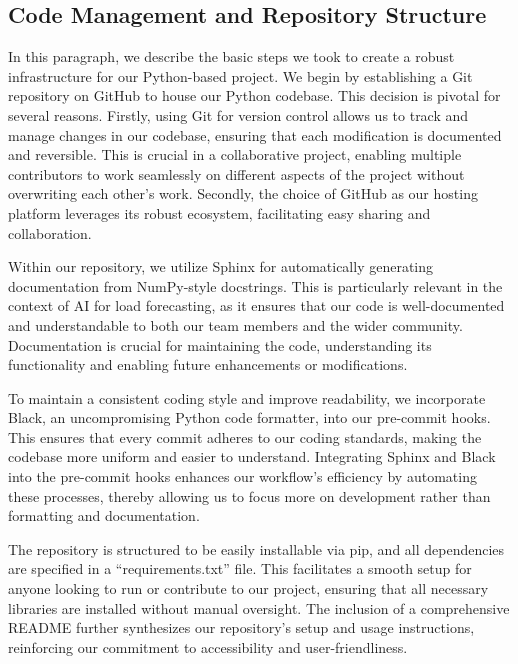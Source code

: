 \documentclass{article} %
\begin{document}
\subsection{Code Management and Repository Structure}
In this paragraph, we describe the basic steps we took to create a robust infrastructure for our Python-based project. We begin by establishing a Git repository on GitHub to house our Python codebase. This decision is pivotal for several reasons. Firstly, using Git for version control allows us to track and manage changes in our codebase, ensuring that each modification is documented and reversible. This is crucial in a collaborative project, enabling multiple contributors to work seamlessly on different aspects of the project without overwriting each other's work. Secondly, the choice of GitHub as our hosting platform leverages its robust ecosystem, facilitating easy sharing and collaboration. 

Within our repository, we utilize Sphinx for automatically generating documentation from NumPy-style docstrings. This is particularly relevant in the context of AI for load forecasting, as it ensures that our code is well-documented and understandable to both our team members and the wider community. Documentation is crucial for maintaining the code, understanding its functionality and enabling future enhancements or modifications. 

To maintain a consistent coding style and improve readability, we incorporate Black, an uncompromising Python code formatter, into our pre-commit hooks. This ensures that every commit adheres to our coding standards, making the codebase more uniform and easier to understand. Integrating Sphinx and Black into the pre-commit hooks enhances our workflow's efficiency by automating these processes, thereby allowing us to focus more on development rather than formatting and documentation. 

The repository is structured to be easily installable via pip, and all dependencies are specified in a “requirements.txt” file. This facilitates a smooth setup for anyone looking to run or contribute to our project, ensuring that all necessary libraries are installed without manual oversight. The inclusion of a comprehensive README further synthesizes our repository's setup and usage instructions, reinforcing our commitment to accessibility and user-friendliness. 
\end{document}
